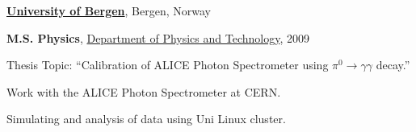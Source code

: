 \documentclass[11pt]{article}
\renewcommand{\section}[2]%
        {\pagebreak[2]\vspace{1.3\baselineskip}%
         \phantomsection\addcontentsline{toc}{section}{#1}%
         \hspace{0in}%
         \marginpar{
         \raggedright \scshape #1}#2}
\newenvironment{outerlist}[1][\enskip\textbullet]%
        {\begin{itemize}[#1]}{\end{itemize}%
         \vspace{-.6\baselineskip}}
\newenvironment{innerlist}[1][\enskip\textbullet]%
        {\begin{compactitem}[#1]}{\end{compactitem}}
\newcommand{\blankline}{\quad\pagebreak[2]}
\begin{document}
\href{http://www.uib.no/en}{\textbf{University of Bergen}},
Bergen, Norway
\begin{outerlist}

\item[] \textbf{M.S. Physics},
  \href{http://www.uib.no/ift/en}
       {Department of Physics and Technology}, 2009
        \begin{innerlist}
          \footnotesize
        \item Thesis Topic: ``Calibration of ALICE Photon Spectrometer
          using $\pi^0\rightarrow\gamma\gamma$ decay.''
        \item Work with the ALICE Photon Spectrometer at CERN.
        \item Simulating and analysis of data using Uni Linux cluster.
        \end{innerlist}


\end{outerlist}








\end{document}
